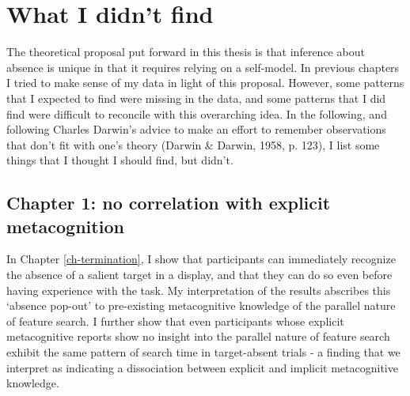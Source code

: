 \documentclass[12pt,twoside]{reedthesis}
\begin{document}
\hypertarget{didnotfind}{%
\section*{What I didn't find}\label{didnotfind}}

The theoretical proposal put forward in this thesis is that inference about absence is unique in that it requires relying on a self-model. In previous chapters I tried to make sense of my data in light of this proposal. However, some patterns that I expected to find were missing in the data, and some patterns that I did find were difficult to reconcile with this overarching idea. In the following, and following Charles Darwin's advice to make an effort to remember observations that don't fit with one's theory (Darwin \& Darwin, 1958, p. 123), I list some things that I thought I should find, but didn't.

\hypertarget{chapter-1-no-correlation-with-explicit-metacognition}{%
\subsection*{Chapter 1: no correlation with explicit metacognition}\label{chapter-1-no-correlation-with-explicit-metacognition}}

In Chapter \ref{ch-termination}, I show that participants can immediately recognize the absence of a salient target in a display, and that they can do so even before having experience with the task. My interpretation of the results abscribes this `absence pop-out' to pre-existing metacognitive knowledge of the parallel nature of feature search. I further show that even participants whose explicit metacognitive reports show no insight into the parallel nature of feature search exhibit the same pattern of search time in target-absent trials - a finding that we interpret as indicating a dissociation between explicit and implicit metacognitive knowledge.
\end{document}
